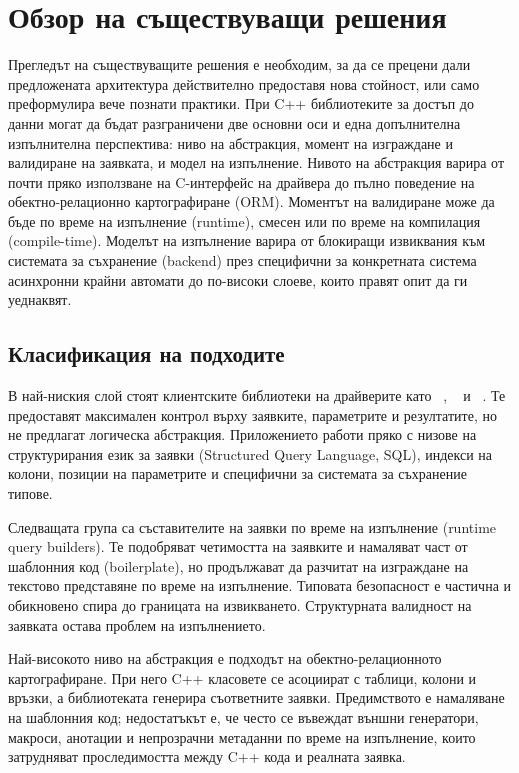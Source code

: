 \section{Обзор на съществуващи решения}
\label{sec:existing_solutions}

Прегледът на съществуващите решения е необходим, за да се прецени дали предложената архитектура действително предоставя нова стойност, или само преформулира вече познати практики. При C++ библиотеките за достъп до данни могат да бъдат разграничени две основни оси и една допълнителна изпълнителна перспектива: ниво на абстракция, момент на изграждане и валидиране на заявката, и модел на изпълнение. Нивото на абстракция варира от почти пряко използване на C-интерфейс на драйвера до пълно поведение на обектно-релационно картографиране (ORM). Моментът на валидиране може да бъде по време на изпълнение (runtime), смесен или по време на компилация (compile-time). Моделът на изпълнение варира от блокиращи извиквания към системата за съхранение (backend) през специфични за конкретната система асинхронни крайни автомати до по-високи слоеве, които правят опит да ги уеднаквят.

\subsection{Класификация на подходите}

В най-ниския слой стоят клиентските библиотеки на драйверите като ~\cite{sqlite_api}, ~\cite{libpq} и ~\cite{mysql_connector}. Те предоставят максимален контрол върху заявките, параметрите и резултатите, но не предлагат логическа абстракция. Приложението работи пряко с низове на структурирания език за заявки (Structured Query Language, SQL), индекси на колони, позиции на параметрите и специфични за системата за съхранение типове.

Следващата група са съставителите на заявки по време на изпълнение (runtime query builders). Те подобряват четимостта на заявките и намаляват част от шаблонния код (boilerplate), но продължават да разчитат на изграждане на текстово представяне по време на изпълнение. Типовата безопасност е частична и обикновено спира до границата на извикването. Структурната валидност на заявката остава проблем на изпълнението.

Най-високото ниво на абстракция е подходът на обектно-релационното картографиране. При него C++ класовете се асоциират с таблици, колони и връзки, а библиотеката генерира съответните заявки. Предимството е намаляване на шаблонния код; недостатъкът е, че често се въвеждат външни генератори, макроси, анотации и непрозрачни метаданни по време на изпълнение, които затрудняват проследимостта между C++ кода и реалната заявка.

